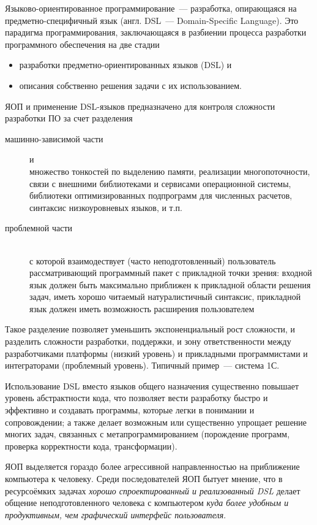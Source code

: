 
Языково-ориентированное программирование\ --- разработка, опирающаяся на
предметно-специфичный язык (англ. DSL\ --- Domain-Specific Lan\-guage).
Это парадигма программирования, заключающаяся в разбиении процесса разработки
программного обеспечения на две стадии
\begin{itemize}[nosep]
  \item 
разработки предметно-ориентированных языков (DSL) и
  \item 
описания собственно решения задачи с их использованием.
\end{itemize}

\noindent
ЯОП и применение DSL-языков предназначено для контроля сложности разработки ПО
за счет разделения
\begin{description}
\item[машинно-зависимой части] и\\
множество тонкостей по выделению памяти, реализации
многопоточности, связи с внешними библиотеками и сервисами операционной системы,
библиотеки оптимизированных подпрограмм для численных расчетов, синтаксис
низкоуровневых языков, и т.п.
\item[проблемной части]\ \\
с которой взаимодествует (часто неподготовленный) пользователь рассматривающий
программный пакет с прикладной точки зрения: входной язык должен быть
максимально приближен к прикладной области решения задач, иметь хорошо читаемый
натуралистичный синтаксис, прикладной язык должен иметь возможность расширения
пользователем
\end{description}

\noindent
Такое разделение позволяет уменьшить экспоненциальный рост сложности, и
разделить сложности разработки, поддержки, и зону ответственности между
разработчиками платформы (низкий уровень) и прикладными программистами и
интеграторами (проблемный уровень). Типичный пример\ --- система 1С.

Использование DSL вместо языков общего назначения существенно повышает уровень
абстрактности кода, что позволяет вести разработку быстро и эффективно и
создавать программы, которые легки в понимании и сопровождении; а также делает
возможным или существенно упрощает решение многих задач, связанных с
метапрограммированием (порождение программ, проверка корректности кода,
трансформации).

ЯОП выделяется гораздо более агрессивной направленностью на приближение
компьютера к человеку. Среди последователей ЯОП бытует мнение, что в
ресурсоёмких задачах \emph{хорошо спроектированный и реализованный DSL} делает
общение неподготовленного человека с компьютером \emph{куда более удобным и
продуктивным, чем графический интерфейс пользователя}.
